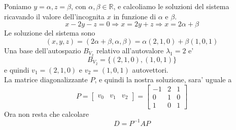 \documentclass[a4paper, 10pt]{article}
\begin{document}
	Poniamo $y = \alpha, z = \beta$, con $\alpha, \beta \in \mathbb{R}$, e calcoliamo le soluzioni del sistema 
	ricavando il valore
	 dell'incognita $x$ in funzione di $\alpha$ e $\beta$.
	\[ x - 2y - z = 0 \Rightarrow x = 2y + z \Rightarrow x = 2\alpha + \beta \]
	Le soluzione del sistema sono 
	\[ (x,y,z) = (2\alpha + \beta, \alpha, \beta) = \alpha(2,1,0) + \beta(1,0,1) \]
	Una base dell'autospazio $B_{V_2}$ relativo all'autovalore $\lambda_1 = 2$ e' 
	\[  B_{V_2} = \lbrace (2,1,0),(1,0,1) \rbrace \] e quindi $v_1 = (2,1,0)$ e $v_2 = (1,0,1)$ autovettori. \\
	La matrice diagonalizzante $P$, e quindi la nostra soluzione, sara' uguale a 
	\[ P = \begin{bmatrix}v_0 &  v_1 & v_2 \end{bmatrix} = 
	\begin{bmatrix} -1 & 2 & 1 \\ 0 & 1 & 0 \\ 1 & 0 & 1  \end{bmatrix} \]
	Ora non resta che calcolare \[ D = P^{-1} A P \]
	
\end{document}

